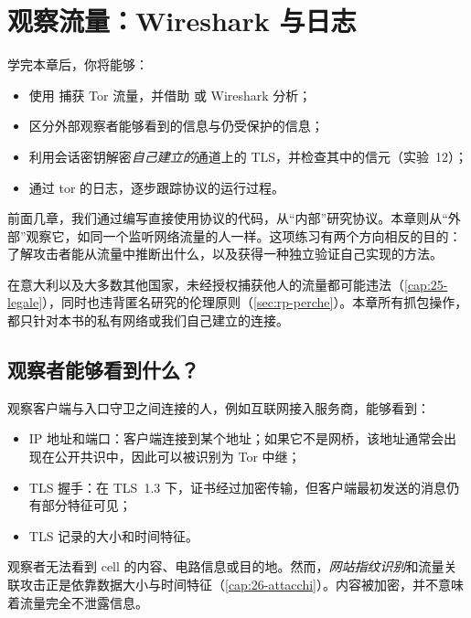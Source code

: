 \chapter{观察流量：Wireshark 与日志}\label{cap:20-traffico}

\begin{obiettivi}
学完本章后，你将能够：
\begin{itemize}[nosep]
  \item 使用  捕获 Tor 流量，并借助  或 Wireshark 分析；
  \item 区分外部观察者能够看到的信息与仍受保护的信息；
  \item 利用会话密钥解密\emph{自己建立的}通道上的 TLS，并检查其中的信元（实验~12）；
  \item 通过 tor 的日志，逐步跟踪协议的运行过程。
\end{itemize}
\end{obiettivi}

前面几章，我们通过编写直接使用协议的代码，从\enquote{内部}研究协议。本章则从\enquote{外部}观察它，如同一个监听网络流量的人一样。这项练习有两个方向相反的目的：了解攻击者能从流量中推断出什么，以及获得一种独立验证自己实现的方法。

\begin{attenzione}
在意大利以及大多数其他国家，未经授权捕获他人的流量都可能违法（\cref{cap:25-legale}），同时也违背匿名研究的伦理原则（\cref{sec:rp-perche}）。本章所有抓包操作，都只针对本书的私有网络或我们自己建立的连接。
\end{attenzione}

\section{观察者能够看到什么？}\label{sec:traffico-osservatore}

观察客户端与入口守卫之间连接的人，例如互联网接入服务商，能够看到：
\begin{itemize}
  \item IP 地址和端口：客户端连接到某个地址；如果它不是网桥，该地址通常会出现在公开共识中，因此可以被识别为 Tor 中继；
  \item TLS 握手：在 TLS~1.3 下，证书经过加密传输，但客户端最初发送的消息仍有部分特征可见；
  \item TLS 记录的大小和时间特征。
\end{itemize}
观察者无法看到 cell 的内容、电路信息或目的地。然而，\emph{网站指纹识别}和流量关联攻击正是依靠数据大小与时间特征（\cref{cap:26-attacchi}）。内容被加密，并不意味着流量完全不泄露信息。

